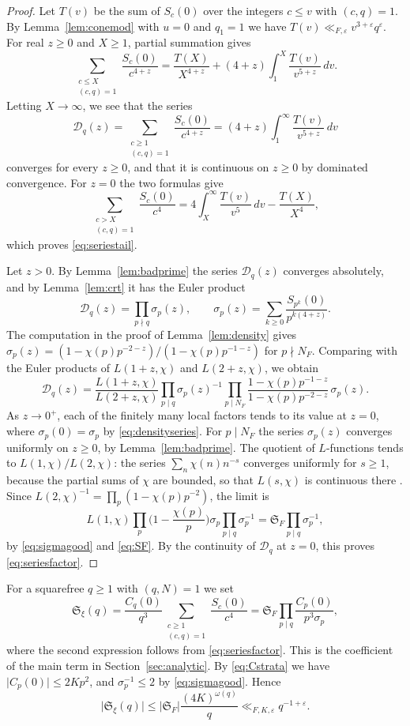 \documentclass[11pt]{amsart}
\numberwithin{equation}{section}
\numberwithin{figure}{section}
\theoremstyle{definition}
\renewcommand{\S}{\mathfrak{S}}
\newcommand{\eps}{\varepsilon}
\newcommand{\abs}[1]{\lvert #1\rvert}
\begin{document}
\begin{proof}
Let $T(v)$ be the sum of $S_c(0)$ over the integers $c\le v$ with
$(c,q)=1$. By Lemma~\ref{lem:conemod} with $u=0$ and $q_1=1$ we have
$T(v)\ll_{F,\eps}v^{3+\eps}q^\eps$. For real $z\ge0$ and $X\ge1$,
partial summation gives
\[
 \sum_{\substack{c\le X\\(c,q)=1}}\frac{S_c(0)}{c^{4+z}}
 =\frac{T(X)}{X^{4+z}}+(4+z)\int_1^X\frac{T(v)}{v^{5+z}}\,dv.
\]
Letting $X\to\infty$, we see that the series
\[
 \mathcal D_q(z)=\sum_{\substack{c\ge1\\(c,q)=1}}\frac{S_c(0)}{c^{4+z}}
 =(4+z)\int_1^\infty\frac{T(v)}{v^{5+z}}\,dv
\]
converges for every $z\ge0$, and that it is continuous on $z\ge0$ by
dominated convergence. For $z=0$ the two formulas give
\[
 \sum_{\substack{c>X\\(c,q)=1}}\frac{S_c(0)}{c^4}
 =4\int_X^\infty\frac{T(v)}{v^5}\,dv-\frac{T(X)}{X^4},
\]
which proves \eqref{eq:seriestail}.

Let $z>0$. By Lemma~\ref{lem:badprime} the series
$\mathcal D_q(z)$ converges absolutely, and by Lemma~\ref{lem:crt}
it has the Euler product
\[
 \mathcal D_q(z)=\prod_{p\nmid q}\sigma_p(z),
 \qquad\sigma_p(z)=\sum_{k\ge0}\frac{S_{p^k}(0)}{p^{k(4+z)}}.
\]
The computation in the proof of Lemma~\ref{lem:density} gives
$\sigma_p(z)=(1-\chi(p)p^{-2-z})/(1-\chi(p)p^{-1-z})$ for
$p\nmid N_F$. Comparing with the Euler products of $L(1+z,\chi)$ and
$L(2+z,\chi)$, we obtain
\[
 \mathcal D_q(z)=\frac{L(1+z,\chi)}{L(2+z,\chi)}
 \prod_{p\mid q}\sigma_p(z)^{-1}
 \prod_{p\mid N_F}\frac{1-\chi(p)p^{-1-z}}{1-\chi(p)p^{-2-z}}\,\sigma_p(z).
\]
As $z\to0^+$, each of the finitely many local factors tends to its
value at $z=0$, where $\sigma_p(0)=\sigma_p$ by
\eqref{eq:densityseries}. For $p\mid N_F$ the series $\sigma_p(z)$
converges uniformly on $z\ge0$, by Lemma~\ref{lem:badprime}. The
quotient of $L$-functions tends to $L(1,\chi)/L(2,\chi)$: the series
$\sum_n\chi(n)n^{-s}$ converges uniformly for $s\ge1$, because the
partial sums of $\chi$ are bounded, so that $L(s,\chi)$ is continuous
there \cite[Section~4.3]{MV}. Since
$L(2,\chi)^{-1}=\prod_p(1-\chi(p)p^{-2})$, the limit is
\[
 L(1,\chi)\prod_p\Big(1-\frac{\chi(p)}p\Big)\sigma_p
 \prod_{p\mid q}\sigma_p^{-1}
 =\S_F\prod_{p\mid q}\sigma_p^{-1},
\]
by \eqref{eq:sigmagood} and \eqref{eq:SF}. By the continuity of
$\mathcal D_q$ at $z=0$, this proves \eqref{eq:seriesfactor}.
\end{proof}

For a squarefree $q\ge1$ with $(q,N)=1$ we set
\begin{equation}\label{eq:Sxi}
 \S_\xi(q)=\frac{C_q(0)}{q^3}\sum_{\substack{c\ge1\\(c,q)=1}}\frac{S_c(0)}{c^4}
 =\S_F\prod_{p\mid q}\frac{C_p(0)}{p^3\sigma_p},
\end{equation}
where the second expression follows from \eqref{eq:seriesfactor}.
This is the coefficient of the main term in
Section~\ref{sec:analytic}. By \eqref{eq:Cstrata} we have
$\abs{C_p(0)}\le2Kp^2$, and $\sigma_p^{-1}\le2$ by
\eqref{eq:sigmagood}. Hence
\begin{equation}\label{eq:Sxibound}
 \abs{\S_\xi(q)}\le\abs{\S_F}\frac{(4K)^{\omega(q)}}q\ll_{F,K,\eps}q^{-1+\eps}.
\end{equation}
\end{document}
